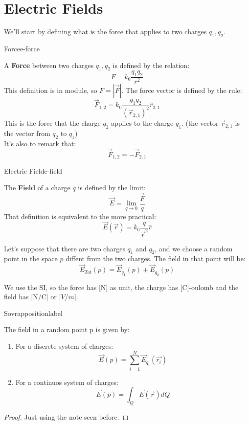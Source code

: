 \documentclass{article}
\begin{document}
\section{Electric Fields}
We'll start by defining what is the force that applies to two charges $q_1, q_2$.
\begin{defi}{Force}{e-force}
  
  A \textbf{Force} between two charges $q_1, q_2$ is defined by the relation:
  $$ F = k_0 \frac{q_1 q_2}{r^2} $$
  This definition is in module, so $F = |\vec F|$. The force vector is defined by the rule:
  $$ \vec{F}_{1,2} = k_0 \frac{q_1 q_2}{(\vec{r}_{2,1})^2}\hat{r}_{2,1} $$
  This is the force that the charge $q_2$ applies to the charge $q_1$. (the vector $\vec{r}_{2,1}$ is the vector from $q_2 \text{ to } q_1$)\\
  It's also to remark that:
  $$ \vec{F}_{1,2} = -  \vec{F}_{2,1}$$
\end{defi}
\begin{defi}{Electric Field}{e-field}

  The \textbf{Field} of a charge $q$ is defined by the limit:
  $$ \vec{E} = \lim_{q \rightarrow 0} \frac{\vec{F}}{q} $$
  That definition is equivalent to the more practical: 
  $$ \vec{E}(\vec{r}) = k_0 \frac{q}{\vec{r}^2} \hat{r} $$
\end{defi}
\begin{note}
  Let's suppose that there are two charges $q_1$ and $q_2$, and we choose a random point in the space $p$ diffent 
  from the two charges. The field in that point will be: 
  $$ \Vec{E}_{Tot}(p) = \vec{E}_{q_1}(p) + \vec{E}_{q_2}(p) $$
\end{note}
\begin{note}
  We use the SI, so the force has [N] as unit, the charge has [C]-oulomb
 and the field has [N/C] or [$V/m$].
\end{note}
\begin{prop}{Sovrapposition}{label}

  The field in a random point p is given by:
  \begin{enumerate}
    \item For a discrete system of charges:
      $$ \vec{E}(p) = \sum^N_{i=1}\vec{E}_{q_i}(\vec{r_i}) $$
    \item For a continuos system of charges:
      $$ \vec{E}(p) = \int_Q \vec{E}(\vec{r})dQ $$
  \end{enumerate}
\end{prop}
\begin{proof}
  Just using the note seen before.

\end{proof}
\end{document}
